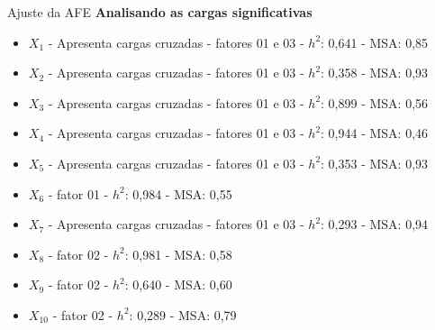 \documentclass[
  ignorenonframetext,
  aspectratio=169,
]{beamer}
\providecommand{\tightlist}{%
  \setlength{\itemsep}{0pt}\setlength{\parskip}{0pt}}
\begin{document}
\begin{frame}{Ajuste da AFE}
\label{ajuste-da-afe-1}
\textbf{Analisando as cargas significativas}

\begin{itemize}
\tightlist
\item
  \(X_1\) - Apresenta cargas cruzadas - fatores 01 e 03 - \(h^2\): 0,641
  - MSA: 0,85
\item
  \(X_2\) - Apresenta cargas cruzadas - fatores 01 e 03 - \(h^2\): 0,358
  - MSA: 0,93
\item
  \(X_3\) - Apresenta cargas cruzadas - fatores 01 e 03 - \(h^2\): 0,899
  - MSA: 0,56
\item
  \(X_4\) - Apresenta cargas cruzadas - fatores 01 e 03 - \(h^2\): 0,944
  - MSA: 0,46
\item
  \(X_5\) - Apresenta cargas cruzadas - fatores 01 e 03 - \(h^2\): 0,353
  - MSA: 0,93
\item
  \(X_6\) - fator 01 - \(h^2\): 0,984 - MSA: 0,55
\item
  \(X_7\) - Apresenta cargas cruzadas - fatores 01 e 03 - \(h^2\): 0,293
  - MSA: 0,94
\item
  \(X_8\) - fator 02 - \(h^2\): 0,981 - MSA: 0,58
\item
  \(X_9\) - fator 02 - \(h^2\): 0,640 - MSA: 0,60
\item
  \(X_{10}\) - fator 02 - \(h^2\): 0,289 - MSA: 0,79
\end{itemize}
\end{frame}
\end{document}
